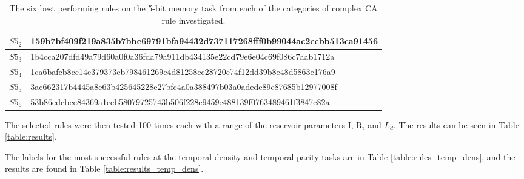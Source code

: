 \documentclass{elsarticle}
\begin{document}
\begin{multicols}{2}
\begin{table}[!htbp]
\begin{tabular}{|p{2cm}|l|}
    \\
    \hline
    $S5_{2}$ & %
159b7bf409f219a835b7bbe69791bfa94432d737117268fff0b99044ac2ccbb513ca91456 \\
\hline
$S5_{3}$ & %
1b4cca207dfd49a79d60a0f0a36fda79a911db434135e22cd79e6e04c69f086c7aab1712a
\\ \hline
$S5_{4}$  & %
1ca6bafcb8cc14e379373cb798461269c4d81258cc28720c74f12dd39b8e48d5863e176a9
\\ \hline
$S5_{5}$ & %
3ac662317b4445a8e63b425645228e27bfc4a0a388497b03a0adede89e87685b12977008f
\\ \hline
$S5_{6}$ & %
53b86edcbce84369a1eeb58079725743b506f228e9459e488139f0763489461f3847c82a
\\ \hline
\end{tabular}
\caption{The six best performing rules on the 5-bit memory task from each of 
   the categories of complex CA rule investigated.}
\label{table:rules}
\end{table}


The selected rules were then tested 100 times each with a range of the 
   reservoir parameters I, R, and $L_{d}$.  The results can be seen in Table 
   \ref{table:results}. \par The labels for the most successful rules at the 
   temporal density and temporal parity tasks are in Table 
   \ref{table:rules_temp_dens}, and the results are found in Table 
   \ref{table:results_temp_dens}.




\end{multicols}
\end{document}
